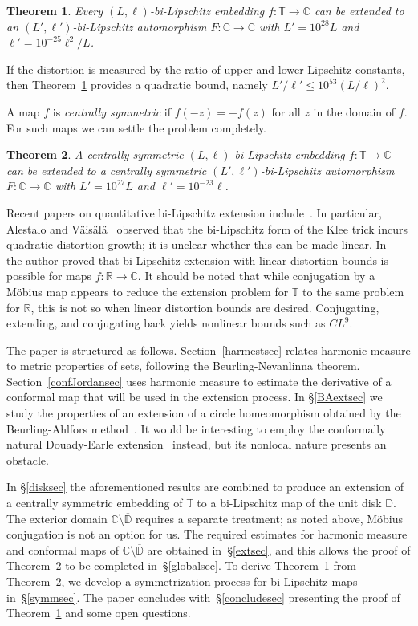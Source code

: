 \documentclass[11pt]{amsart}
\newtheorem{theorem}{Theorem}[section]
\theoremstyle{remark}
\numberwithin{equation}{section}
\newcommand{\C}{\mathbb{C}}
\newcommand{\DD}{\mathbb{D}}
\newcommand{\R}{\mathbb{R}}
\newcommand{\T}{\mathbb{T}}
\begin{document}
\begin{theorem}\label{mainthmgen} Every $(L,\ell)$-bi-Lipschitz embedding $f\colon \T\to \C$ can be extended to an $(L', \ell')$-bi-Lipschitz automorphism $F\colon \C\to\C$  with $L'= 10^{28} L$ and $\ell' = 10^{-25} \ell^2/L$. 
\end{theorem}

If the distortion is measured by the ratio of upper and lower Lipschitz constants, then Theorem~\ref{mainthmgen} provides a quadratic bound, namely $L'/\ell' \le 10^{53} (L/\ell)^2$.

A map $f$ is \textit{centrally symmetric} if $f(-z) = -f(z)$ for all $z$ in the domain of $f$. For such maps we can settle the problem completely. 

\begin{theorem}\label{mainthm} A centrally symmetric $(L,\ell)$-bi-Lipschitz embedding $f\colon \T\to \C$ can be extended to a centrally symmetric $(L', \ell')$-bi-Lipschitz automorphism $F\colon \C\to\C$  with $L'= 10^{27} L$ and $\ell' = 10^{-23} \ell$. 
\end{theorem}

Recent papers on quantitative bi-Lipschitz extension include~\cite{ATV, ATV2, AV, AS, Ka, Ko, Mac, T}. In particular, Alestalo and V\"ais\"al\"a~\cite{AV} observed that the bi-Lipschitz form of the Klee trick incurs quadratic distortion growth; it is unclear whether this can be made linear. In~\cite{Ko} the author proved that bi-Lipschitz extension with linear distortion bounds is possible for maps $f\colon \R\to\C$. It should be noted that while conjugation by a M\"obius map appears to reduce the extension problem for $\T$ to the same problem for $\R$, this is not so when linear distortion bounds are desired. Conjugating, extending, and conjugating back yields nonlinear bounds such as $CL^9$. 

The paper is structured as follows. 
Section~\ref{harmestsec} relates harmonic measure to metric properties of sets, following the Beurling-Nevanlinna theorem. Section~\ref{confJordansec} uses harmonic measure to estimate the derivative of a  conformal map that will be used in the extension process. In \S\ref{BAextsec} we study the properties of an extension of a circle homeomorphism obtained by the Beurling-Ahlfors method~\cite{BA}. It would be interesting to employ the conformally natural Douady-Earle extension~\cite{DE} instead, but its nonlocal nature presents an obstacle. 

In \S\ref{disksec} the aforementioned results are combined to produce an extension of a centrally symmetric  embedding of $\T$ to a bi-Lipschitz map of the unit disk $\DD$. The exterior domain $\C\setminus \overline{\DD}$ requires a separate treatment; as noted above, M\"obius conjugation is not an option for us. 
The required estimates for harmonic measure and conformal maps of $\C\setminus \overline{\DD}$  are  obtained in~\S\ref{extsec}, and this allows the proof of Theorem~\ref{mainthm} to be completed in~\S\ref{globalsec}. To derive Theorem~\ref{mainthmgen} from Theorem~\ref{mainthm}, we develop a symmetrization process for bi-Lipschitz maps in~\S\ref{symmsec}. The paper concludes with~\S\ref{concludesec} presenting the proof of Theorem~\ref{mainthmgen} and some open questions.  
\end{document}
